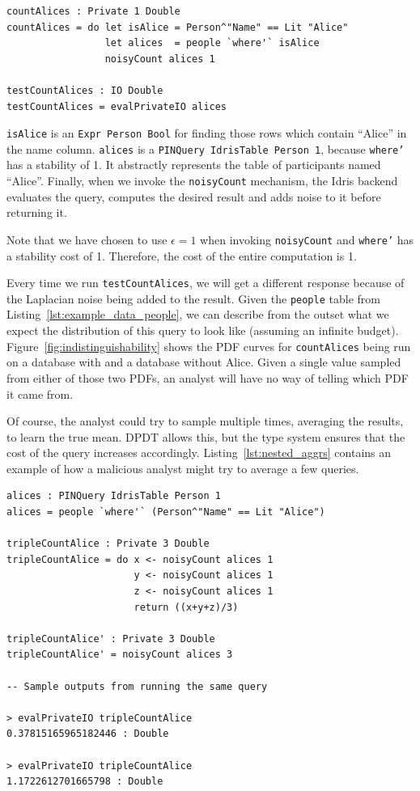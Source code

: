 \documentclass[12pt]{report}
\begin{document}
\begin{lstlisting}[caption={Counting Alices},label={lst:counting_alices}]
countAlices : Private 1 Double
countAlices = do let isAlice = Person^"Name" == Lit "Alice"
                 let alices  = people `where'` isAlice
                 noisyCount alices 1

testCountAlices : IO Double
testCountAlices = evalPrivateIO alices
\end{lstlisting}

\texttt{isAlice} is an \texttt{Expr Person Bool} for finding those rows which contain ``Alice'' in the name column.
\texttt{alices} is a \texttt{PINQuery IdrisTable Person 1}, because \texttt{where'} has a stability of 1.
It abstractly represents the table of participants named ``Alice''.
Finally, when we invoke the \texttt{noisyCount} mechanism, the Idris backend evaluates the query, computes the desired result and adds noise to it before returning it.

Note that we have chosen to use $\epsilon = 1$ when invoking \texttt{noisyCount} and \texttt{where'} has a stability cost of 1.
Therefore, the cost of the entire computation is 1.

Every time we run \texttt{testCountAlices}, we will get a different response because of the Laplacian noise being added to the result.
Given the \texttt{people} table from Listing~\ref{lst:example_data_people}, we can describe from the outset what we expect the distribution of this query to look like (assuming an infinite budget).
Figure~\ref{fig:indistinguishability} shows the PDF curves for \texttt{countAlices} being run on a database with and a database without Alice.
Given a single value sampled from either of those two PDFs, an analyst will have no way of telling which PDF it came from.

Of course, the analyst could try to sample multiple times, averaging the results, to learn the true mean.
DPDT allows this, but the type system ensures that the cost of the query increases accordingly.
Listing~\ref{lst:nested_aggrs} contains an example of how a malicious analyst might try to average a few queries.

\begin{lstlisting}[caption={Counting Alices (revisited)},label={lst:nested_aggrs}]
alices : PINQuery IdrisTable Person 1
alices = people `where'` (Person^"Name" == Lit "Alice")

tripleCountAlice : Private 3 Double
tripleCountAlice = do x <- noisyCount alices 1
                      y <- noisyCount alices 1
                      z <- noisyCount alices 1
                      return ((x+y+z)/3)

tripleCountAlice' : Private 3 Double
tripleCountAlice' = noisyCount alices 3

-- Sample outputs from running the same query

> evalPrivateIO tripleCountAlice
0.37815165965182446 : Double

> evalPrivateIO tripleCountAlice
1.1722612701665798 : Double
\end{lstlisting}
\end{document}
